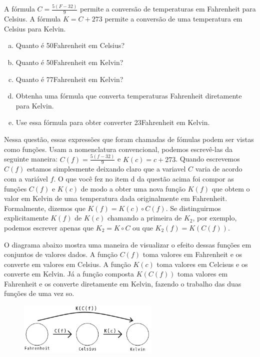 \documentclass[main_estudante.tex]{subfiles}
\begin{document}
\begin{questao}
A fórmula $C=\frac{5(F-32)}{9}$ permite a conversão de temperaturas em Fahrenheit para Celsius. A fórmula $K=C+273$ permite a conversão de uma temperatura em Celsius para Kelvin.
\begin{enumerate}[a)]
\item Quanto é 50\degree Fahrenheit em Celsius?
\item Quanto é 50\degree Fahrenheit em Kelvin?
\item Quanto é 77\degree Fahrenheit em Kelvin?
\item Obtenha uma fórmula que converta temperaturas Fahrenheit diretamente para Kelvin.
\item Use essa fórmula para obter converter 23\degree Fahrenheit em Kelvin.
\end{enumerate}
\end{questao}

Nessa questão, essas expressões que foram chamadas de fómulas podem ser vistas como funções. Usam a nomenclatura convencional, podemos escrevê-las da seguinte maneira: $C(f)=\frac{5(f-32)}{9}$ e $K(c)=c+273$. Quando escrevemos $C(f)$ estamos simplesmente deixando claro que a variavel $C$ varia de acordo com a variável $f$. O que você fez no item d da questão acima foi compor as funções $C(f)$ e $K(c)$ de modo a obter uma nova função $K(f)$ que obtem o valor em Kelvin de uma temperatura dada originalmente em Fahrenheit.
Formalmente, dizemos que $K(f) = K(c) \circ C(f)$. Se distinguirmos explicitamente $K(f)$ de $K(c)$ chamando a primeira de $K_2$, por exemplo, podemos escrever apenas que $K_2=K \circ C$ ou que $K_2(f) = K(C(f))$.

O diagrama abaixo mostra uma maneira de visualizar o efeito dessas funções em conjuntos de valores dados. A função $C(f)$ toma valores em Fahrenheit e os converte em valores em Celsius. A função $K(c)$ toma valores em Celcisus e os converte em Kelvin. Já a função composta $K(C(f))$ toma valores em Fahrenheit e os converte diretamente em Kelvin, fazendo o trabalho das duas funções de uma vez so.

\begin{figure}[h]
\centering
\includegraphics[width=0.6\textwidth]{./img/c5q5.png}
\end{figure}
\end{document}
